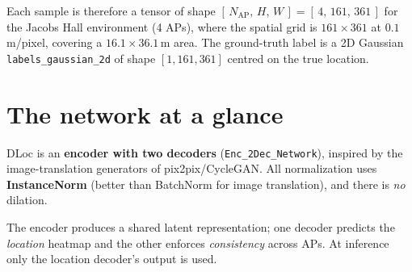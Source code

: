 \documentclass[11pt,a4paper]{article}
\begin{document}
Each sample is therefore a tensor of shape $[\,N_{\text{AP}},\,H,\,W\,] = [\,4,\,161,\,361\,]$
for the Jacobs Hall environment (4 APs), where the spatial grid is $161\times361$ at
$0.1$\,m/pixel, covering a $16.1\times36.1$\,m area. The ground-truth label is a 2D Gaussian
\texttt{labels\_gaussian\_2d} of shape $[1,161,361]$ centred on the true location.

\section{The network at a glance}

DLoc is an \textbf{encoder with two decoders} (\texttt{Enc\_2Dec\_Network}), inspired by the
image-translation generators of pix2pix/CycleGAN. All normalization uses \textbf{InstanceNorm}
(better than BatchNorm for image translation), and there is \emph{no} dilation.

\begin{center}
\end{center}

The encoder produces a shared latent representation; one decoder predicts the \emph{location}
heatmap and the other enforces \emph{consistency} across APs. At inference only the location
decoder's output is used.
\end{document}
